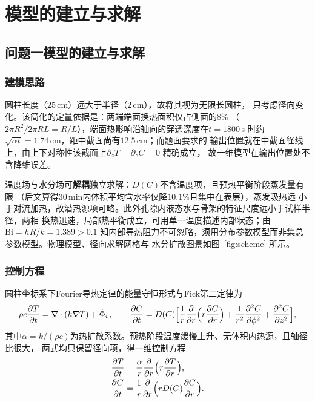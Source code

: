 \documentclass[withoutpreface,bwprint]{cumcmthesis} %
\begin{document}
\section{模型的建立与求解}
\label{sec:model}

\subsection{问题一模型的建立与求解}

\subsubsection{建模思路}

圆柱长度（$25\,\mathrm{cm}$）远大于半径（$2\,\mathrm{cm}$），故将其视为无限长圆柱，
只考虑径向变化。该简化的定量依据是：两端端面换热面积仅占侧面的$8\%$
（$2\pi R^2/2\pi RL=R/L$），端面热影响沿轴向的穿透深度在$t=1800\,\mathrm{s}$ 时约
$\sqrt{\alpha t}=1.74\,\mathrm{cm}$，距中截面尚有$12.5\,\mathrm{cm}$；而题面要求的
输出位置就在中截面径线上，由上下对称性该截面上$\partial_zT=\partial_zC=0$ 精确成立，
故一维模型在输出位置处不含降维误差。

温度场与水分场可\textbf{解耦}独立求解：$D(C)$不含温度项，且预热平衡阶段蒸发量有限
（后文算得$30\,\mathrm{min}$内体积平均含水率仅降$10.1\%$且集中在表层），蒸发吸热远
小于对流加热，故潜热源项可略。此外孔隙内液态水与骨架的特征尺度远小于试样半径，两相
换热迅速，局部热平衡成立，可用单一温度描述内部状态；由$\mathrm{Bi}=hR/k=1.389>0.1$
知内部导热阻力不可忽略，须用分布参数模型而非集总参数模型。物理模型、径向求解网格与
水分扩散图景如图~\ref{fig:scheme} 所示。

\subsubsection{控制方程}

圆柱坐标系下Fourier导热定律的能量守恒形式与Fick第二定律为
\begin{equation}
\rho c \frac{\partial T}{\partial t}=\nabla \cdot (k\nabla T)+\dot\Phi_v,
\qquad
\frac{\partial C}{\partial t}=D(C)\Bigl[\frac{1}{r}\frac{\partial}{\partial r}\Bigl(r\frac{\partial C}{\partial r}\Bigr)
+\frac{1}{r^2}\frac{\partial^2 C}{\partial \phi^2}+\frac{\partial^2C}{\partial z^2}\Bigr],
\end{equation}
其中$\alpha=k/(\rho c)$为热扩散系数。预热阶段温度缓慢上升、无体积内热源，且轴径比很大，
两式均只保留径向项，得一维控制方程
\begin{align}
\label{eq:q1T}
\frac{\partial T}{\partial t}&=\frac{\alpha}{r}\frac{\partial}{\partial r}\Bigl(r\frac{\partial T}{\partial r}\Bigr),\\
\label{eq:q1C}
\frac{\partial C}{\partial t}&=\frac{1}{r}\frac{\partial}{\partial r}\Bigl(rD(C)\frac{\partial C}{\partial r}\Bigr).
\end{align}
\end{document}
